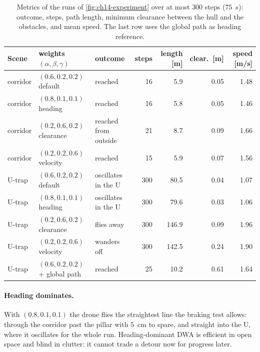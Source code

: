 \begin{table}[tb]
  \centering\small
  \caption{Metrics of the runs of \cref{fig:ch14-experiment} over at most
  $300$ steps ($75$~s): outcome, steps, path length, minimum clearance
  between the hull and the obstacles, and mean speed. The last row uses the
  global path as heading reference.}
  \label{tab:ch14-weights}
  \setlength{\tabcolsep}{4pt}\footnotesize
  \begin{tabular}{@{}lllrrrr@{}}
  \toprule
  Scene & weights $(\alpha, \beta, \gamma)$ & outcome & steps & length [m] & clear.\ [m] & speed [m/s]\\
  \midrule
  corridor & $(0.6, 0.2, 0.2)$ default & reached & 16 & 5.9 & 0.05 & 1.48\\
  corridor & $(0.8, 0.1, 0.1)$ heading & reached & 16 & 5.8 & 0.05 & 1.46\\
  corridor & $(0.2, 0.6, 0.2)$ clearance & reached from outside & 21 & 8.7 & 0.09 & 1.66\\
  corridor & $(0.2, 0.2, 0.6)$ velocity & reached & 15 & 5.9 & 0.07 & 1.56\\
  \midrule
  U-trap & $(0.6, 0.2, 0.2)$ default & oscillates in the U & 300 & 80.5 & 0.04 & 1.07\\
  U-trap & $(0.8, 0.1, 0.1)$ heading & oscillates in the U & 300 & 79.6 & 0.03 & 1.06\\
  U-trap & $(0.2, 0.6, 0.2)$ clearance & flies away & 300 & 146.9 & 0.09 & 1.96\\
  U-trap & $(0.2, 0.2, 0.6)$ velocity & wanders off & 300 & 142.5 & 0.24 & 1.90\\
  U-trap & $(0.6, 0.2, 0.2)$ + global path & reached & 25 & 10.2 & 0.61 & 1.64\\
  \bottomrule
  \end{tabular}
\end{table}

\paragraph{Heading dominates.}
With $(0.8, 0.1, 0.1)$ the drone flies the straightest line the braking test
allows: through the corridor past the pillar with $5$~cm to spare, and
straight into the U, where it oscillates for the whole run. Heading-dominant
DWA is efficient in open space and blind in clutter: it cannot trade a detour
now for progress later.

